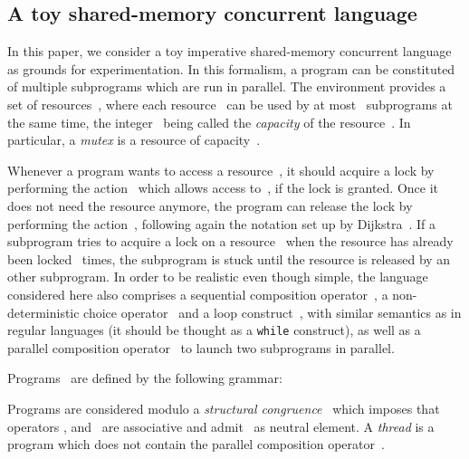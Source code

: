 \documentclass[orivec]{llncs} \usepackage[T1]{fontenc}
\begin{document}
\subsection{A toy shared-memory concurrent language}
\label{language}

In this paper, we consider a toy imperative shared-memory concurrent language as
grounds for experimentation. In this formalism, a program can be constituted of
multiple subprograms which are run in parallel. The environment provides a set
of resources~, where each resource~ can be used by
at most~ subprograms at the same time, the
integer~ being called the \emph{capacity} of the
resource~. In particular, a \emph{mutex} is a resource of capacity~.

Whenever a program wants to access a resource~, it should acquire a lock by
performing the action~ which allows access to~, if the lock is
granted. Once it does not need the resource anymore, the program can release the
lock by performing the action~, following again the notation set up by
Dijkstra~\cite{DijkstraPV}. If a subprogram tries to acquire a lock on a
resource~ when the resource has already been locked~ times, the
subprogram is stuck until the resource is released by an other subprogram. In
order to be realistic even though simple, the language considered here also
comprises a sequential composition operator~, a non-deterministic choice
operator~ and a loop construct~, with similar semantics as in regular
languages (it should be thought as a \texttt{while} construct), as well as a
parallel composition operator~ to launch two subprograms in parallel.

Programs~ are defined by the following grammar:

Programs are considered modulo a \emph{structural congruence}~ which
imposes that operators ,  and~ are associative and admit~ as
neutral element.
A \emph{thread} is a program which does not contain the parallel composition
operator~.
\end{document}
